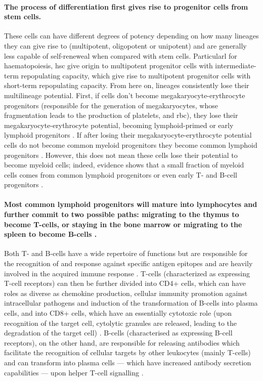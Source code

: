 \paragraph{The process of differentiation first gives rise to progenitor cells from stem cells.} These cells can have different degrees of potency depending on how many lineages they can give rise to (multipotent, oligopotent or unipotent) and are generally less capable of self-reneweal when compared with stem cells. Particularl for haematopoiesis, \ac{hsc} give origin to multipotent progenitor cells with intermediate-term repopulating capacity, which give rise to multipotent progenitor cells with short-term repopulating capacity. From here on, lineages consistently lose their multilineage potential. First, if cells don’t become megakaryocyte-erythrocyte progenitors (responsible for the generation of megakaryocytes, whose fragmentation leads to the production of platelets, and \ac{rbc}), they lose their megakaryocyte-erythrocyte potential, becoming lymphoid-primed or early lymphoid progenitors \cite{Adolfsson2005-iq}. If after losing their megakaryocyte-erythrocyte potential cells do not become common myeloid progenitors they become common lymphoid progenitors \cite{Kondo1997-fb}. However, this does not mean these cells lose their potential to become myeloid cells; indeed, evidence shows that a small fraction of myeloid cells comes from common lymphoid progenitors or even early T- and B-cell progenitors \cite{Schlenner2010-ga,Kawamoto2010-yp}. 
\paragraph{Most common lymphoid progenitors will mature into lymphocytes and further commit to two possible paths: migrating to the thymus to become T-cells, or staying in the bone marrow or migrating to the spleen to become B-cells \cite{Inlay2009-as}.} Both T- and B-cells have a wide repertoire of functions but are responsible for the recognition of and response against specific antigen epitopes and are heavily involved in the acquired immune response \cite{Cano2013-gu}. T-cells (characterized as expressing T-cell receptors) can then be further divided into CD4+ cells, which can have roles as diverse as chemokine production, cellular immunity promotion against intracellular pathogens and induction of the transformation of B-cells into plasma cells, and into CD8+ cells, which have an essentially cytotoxic role (upon recognition of the target cell, cytolytic granules are released, leading to the degradation of the target cell) \cite{Cano2013-gu}. B-cells (characterised as expressing B-cell receptors), on the other hand, are responsible for releasing antibodies which facilitate the recognition of cellular targets by other leukocytes (mainly T-cells) and can transform into plasma cells --- which have increased antibody secretion capabilities --- upon helper T-cell signalling \cite{Cano2013-gu,Janeway2001-mb}. 
